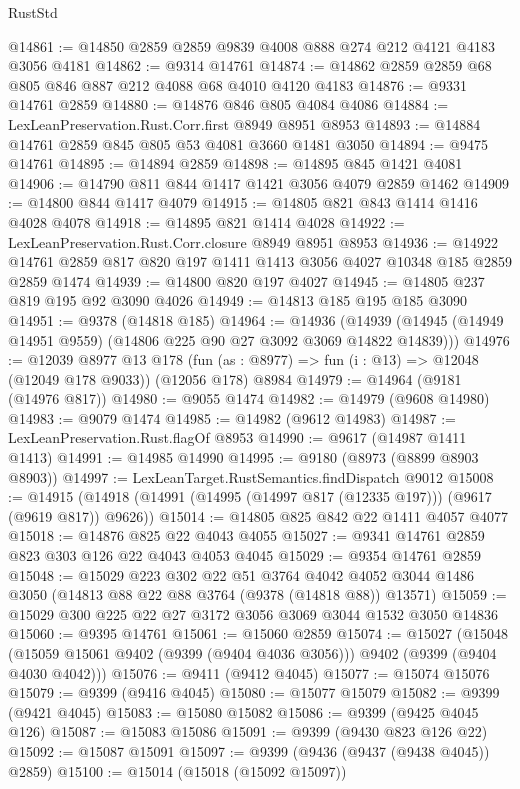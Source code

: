 \begin{lexlean}{RustStd}
\begin{coremodule}
@14861 := @14850 @2859 @2859 @9839 @4008 @888 @274 @212 @4121 @4183 @3056 @4181
@14862 := @9314 @14761
@14874 := @14862 @2859 @2859 @68 @805 @846 @887 @212 @4088 @68 @4010 @4120 @4183
@14876 := @9331 @14761 @2859
@14880 := @14876 @846 @805 @4084 @4086
@14884 := LexLeanPreservation.Rust.Corr.first @8949 @8951 @8953
@14893 := @14884 @14761 @2859 @845 @805 @53 @4081 @3660 @1481 @3050
@14894 := @9475 @14761
@14895 := @14894 @2859
@14898 := @14895 @845 @1421 @4081
@14906 := @14790 @811 @844 @1417 @1421 @3056 @4079 @2859 @1462
@14909 := @14800 @844 @1417 @4079
@14915 := @14805 @821 @843 @1414 @1416 @4028 @4078
@14918 := @14895 @821 @1414 @4028
@14922 := LexLeanPreservation.Rust.Corr.closure @8949 @8951 @8953
@14936 := @14922 @14761 @2859 @817 @820 @197 @1411 @1413 @3056 @4027 @10348 @185 @2859 @2859 @1474
@14939 := @14800 @820 @197 @4027
@14945 := @14805 @237 @819 @195 @92 @3090 @4026
@14949 := @14813 @185 @195 @185 @3090
@14951 := @9378 (@14818 @185)
@14964 := @14936
    (@14939 (@14945 (@14949 @14951 @9559) (@14806 @225 @90 @27 @3092 @3069 @14822 @14839)))
@14976 := @12039
    @8977
    @13
    @178
    (fun (as : @8977) => fun (i : @13) => @12048 (@12049 @178 @9033))
    (@12056 @178)
    @8984
@14979 := @14964 (@9181 (@14976 @817))
@14980 := @9055 @1474
@14982 := @14979 (@9608 @14980)
@14983 := @9079 @1474
@14985 := @14982 (@9612 @14983)
@14987 := LexLeanPreservation.Rust.flagOf @8953
@14990 := @9617 (@14987 @1411 @1413)
@14991 := @14985 @14990
@14995 := @9180 (@8973 (@8899 @8903 @8903))
@14997 := LexLeanTarget.RustSemantics.findDispatch @9012
@15008 := @14915 (@14918 (@14991 (@14995 (@14997 @817 (@12335 @197))) (@9617 (@9619 @817)) @9626))
@15014 := @14805 @825 @842 @22 @1411 @4057 @4077
@15018 := @14876 @825 @22 @4043 @4055
@15027 := @9341 @14761 @2859 @823 @303 @126 @22 @4043 @4053 @4045
@15029 := @9354 @14761 @2859
@15048 := @15029
    @223
    @302
    @22
    @51
    @3764
    @4042
    @4052
    @3044
    @1486
    @3050
    (@14813 @88 @22 @88 @3764 (@9378 (@14818 @88)) @13571)
@15059 := @15029 @300 @225 @22 @27 @3172 @3056 @3069 @3044 @1532 @3050 @14836
@15060 := @9395 @14761
@15061 := @15060 @2859
@15074 := @15027
    (@15048 (@15059 @15061 @9402 (@9399 (@9404 @4036 @3056))) @9402 (@9399 (@9404 @4030 @4042)))
@15076 := @9411 (@9412 @4045)
@15077 := @15074 @15076
@15079 := @9399 (@9416 @4045)
@15080 := @15077 @15079
@15082 := @9399 (@9421 @4045)
@15083 := @15080 @15082
@15086 := @9399 (@9425 @4045 @126)
@15087 := @15083 @15086
@15091 := @9399 (@9430 @823 @126 @22)
@15092 := @15087 @15091
@15097 := @9399 (@9436 (@9437 (@9438 @4045)) @2859)
@15100 := @15014 (@15018 (@15092 @15097))

\end{coremodule}
\end{lexlean}
